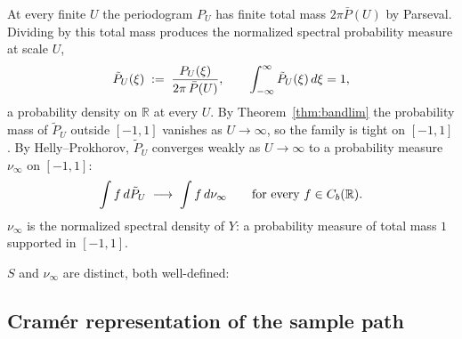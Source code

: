 \documentclass{article}
\newcommand{\assign}{:=}
\begin{document}
At every finite $U$ the periodogram $P_U$ has finite total mass $2 \pi \bar{P}
(U)$ by Parseval. Dividing by this total mass produces the normalized spectral
probability measure at scale $U$,
\[ \tilde{P}_U (\xi) \hspace{0.27em} \assign \hspace{0.27em} \frac{P_U
   (\xi)}{2 \pi \hspace{0.17em} \bar{P} (U)}, \qquad \int_{- \infty}^{\infty}
   \tilde{P}_U (\xi)  \hspace{0.17em} d \xi = 1, \]
a probability density on $\mathbb{R}$ at every $U$. By
Theorem~\ref{thm:bandlim} the probability mass of $\tilde{P}_U$ outside $[- 1,
1]$ vanishes as $U \to \infty$, so the family is tight on $[- 1, 1]$. By
Helly--Prokhorov, $\tilde{P}_U$ converges weakly as $U \to \infty$ to a
probability measure $\nu_{\infty}$ on $[- 1, 1]$:
\[ \int f \hspace{0.17em} d \tilde{P}_U \hspace{0.27em} \longrightarrow
   \hspace{0.27em} \int f \hspace{0.17em} d \nu_{\infty}  \qquad \text{for
   every } f \in C_b (\mathbb{R}) . \]
$\nu_{\infty}$ is the normalized spectral density of $Y$: a probability
measure of total mass $1$ supported in $[- 1, 1]$.

$S$ and $\nu_{\infty}$ are distinct, both well-defined:

{}

\subsection{Cram{\'e}r representation of the sample path}\label{app:cramer}
\end{document}
